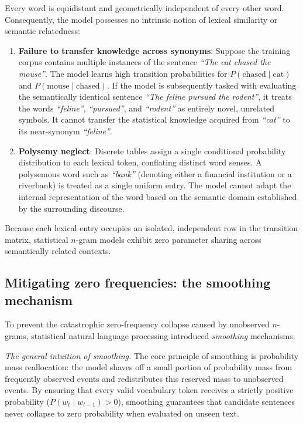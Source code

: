 \documentclass[../../main.tex]{subfiles}
\begin{document}
Every word is equidistant and geometrically independent of every other word. Consequently, the model possesses no intrinsic notion of lexical similarity or semantic relatedness:
\begin{enumerate}
    \item \textbf{Failure to transfer knowledge across synonyms}: Suppose the training corpus contains multiple instances of the sentence \textit{``The cat chased the mouse''}. The model learns high transition probabilities for $P(\text{chased} \mid \text{cat})$ and $P(\text{mouse} \mid \text{chased})$. If the model is subsequently tasked with evaluating the semantically identical sentence \textit{``The feline pursued the rodent''}, it treats the words \textit{``feline''}, \textit{``pursued''}, and \textit{``rodent''} as entirely novel, unrelated symbols. It cannot transfer the statistical knowledge acquired from \textit{``cat''} to its near-synonym \textit{``feline''}.
    \item \textbf{Polysemy neglect}: Discrete tables assign a single conditional probability distribution to each lexical token, conflating distinct word senses. A polysemous word such as \textit{``bank''} (denoting either a financial institution or a riverbank) is treated as a single uniform entry. The model cannot adapt the internal representation of the word based on the semantic domain established by the surrounding discourse.
\end{enumerate}

Because each lexical entry occupies an isolated, independent row in the transition matrix, statistical $n$-gram models exhibit zero parameter sharing across semantically related contexts.

\subsection{Mitigating zero frequencies: the smoothing mechanism}
\label{subsec:smoothing_mitigation}

To prevent the catastrophic zero-frequency collapse caused by unobserved $n$-grams, statistical natural language processing introduced \textit{smoothing} mechanisms. 

\textit{The general intuition of smoothing.} The core principle of smoothing is probability mass reallocation: the model shaves off a small portion of probability mass from frequently observed events and redistributes this reserved mass to unobserved events. By ensuring that every valid vocabulary token receives a strictly positive probability ($P(w_t \mid w_{t-1}) > 0$), smoothing guarantees that candidate sentences never collapse to zero probability when evaluated on unseen text.
\end{document}
